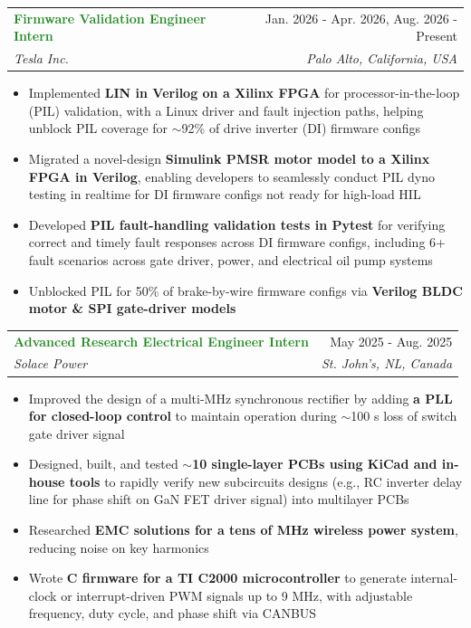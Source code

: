 \documentclass[letterpaper,11pt]{article}
\makeatletter
\newcommand{\resumeItem}[1]{
  \item\small{
    {#1 \vspace{-2pt}}
  }
}
\newcommand{\resumeSubheading}[4]{
  \vspace{-2pt}\item
    \begin{tabular*}{0.97\textwidth}[t]{l@{\extracolsep{\fill}}r}
      \textbf{\textcolor{ForestGreen}{#1}} & #2 \\
      \textit{\small#3} & \textit{\small #4} \\
    \end{tabular*}\vspace{-7pt}
}
\newcommand{\resumeItemListStart}{\begin{itemize}[leftmargin=0.15in]}
\newcommand{\resumeItemListEnd}{\end{itemize}\vspace{-5pt}}
\makeatother
\begin{document}
  \resumeSubheading
    {Firmware Validation Engineer Intern}{Jan. 2026 - Apr. 2026, Aug. 2026 - Present}
    {Tesla Inc.}{Palo Alto, California, USA}
    \resumeItemListStart
      \resumeItem{Implemented \textbf{LIN in Verilog on a Xilinx FPGA} for processor-in-the-loop (PIL) validation, with a Linux driver and fault injection paths, helping unblock PIL coverage for \(\sim\)92\% of drive inverter (DI) firmware configs}
      \resumeItem{Migrated a novel-design \textbf{Simulink PMSR motor model to a Xilinx FPGA in Verilog},
                 enabling developers to seamlessly conduct PIL dyno testing in realtime for DI firmware configs not ready for high-load HIL}
      \resumeItem{Developed \textbf{PIL fault-handling validation tests in Pytest} for verifying correct and timely fault responses 
            across DI firmware configs, including 6+ fault scenarios across gate driver, power, and electrical oil pump systems}
      \resumeItem{Unblocked PIL for 50\% of brake-by-wire firmware configs via \textbf{Verilog BLDC motor \& SPI gate-driver models }}
    \resumeItemListEnd
    
    \resumeSubheading
      {Advanced Research Electrical Engineer Intern}{May 2025 - Aug. 2025}
      {Solace Power}{St. John's, NL, Canada}
      \resumeItemListStart
        \resumeItem{Improved the design of a multi-MHz synchronous rectifier by adding \textbf{a PLL for closed-loop control} to maintain 
        operation during \(\sim \)100 \textmu s loss of switch gate driver signal}
        \resumeItem{Designed, built, and tested \textbf{\(\sim \)10 single-layer PCBs using KiCad and in-house tools} to rapidly verify new subcircuits designs (e.g., RC inverter delay line for phase shift on GaN FET driver signal) into multilayer PCBs}
        \resumeItem{Researched \textbf{EMC solutions for a tens of MHz wireless power system}, reducing noise on key harmonics}
        \resumeItem{Wrote \textbf{C firmware for a TI C2000 microcontroller} to generate internal-clock or interrupt-driven PWM signals up to 9 MHz, 
                  with adjustable frequency, duty cycle, and phase shift via CANBUS}
      \resumeItemListEnd
\end{document}
